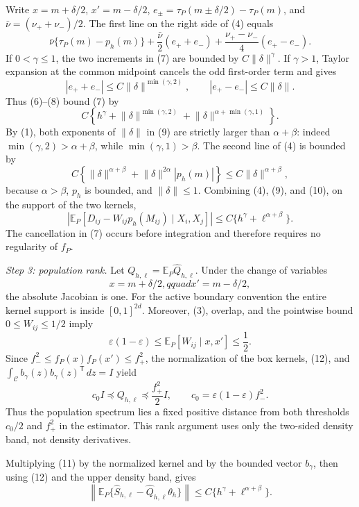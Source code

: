 Write \(x=m+\delta/2\), \(x'=m-\delta/2\),
\(e_\pm=\tau_P(m\pm\delta/2)-\tau_P(m)\), and
\(\bar\nu=(\nu_++\nu_-)/2\).  The first line on the right side of (4)
equals
\[
\bar\nu\{\tau_P(m)-p_h(m)\}
+\frac{\bar\nu}{2}(e_++e_-)
+\frac{\nu_+-\nu_-}{4}(e_+-e_-).
\tag{7}
\]
If \(0<\gamma\leq1\), the two increments in (7) are bounded by
\(C\lVert\delta\rVert^\gamma\).  If \(\gamma>1\), Taylor expansion at
the common midpoint cancels the odd first-order term and gives
\[
|e_++e_-|\leq C\lVert\delta\rVert^{\min(\gamma,2)},
\qquad
|e_+-e_-|\leq C\lVert\delta\rVert.
\tag{8}
\]
Thus (6)--(8) bound (7) by
\[
C\left\{h^\gamma
+\lVert\delta\rVert^{\min(\gamma,2)}
+\lVert\delta\rVert^{\alpha+\min(\gamma,1)}\right\}.
\tag{9}
\]
By (1), both exponents of \(\lVert\delta\rVert\) in (9) are strictly
larger than \(\alpha+\beta\): indeed
\(\min(\gamma,2)>\alpha+\beta\), while
\(\min(\gamma,1)>\beta\).  The second line of (4) is bounded by
\[
C\left\{
\lVert\delta\rVert^{\alpha+\beta}
+\lVert\delta\rVert^{2\alpha}|p_h(m)|
\right\}
\leq C\lVert\delta\rVert^{\alpha+\beta},
\tag{10}
\]
because \(\alpha>\beta\), \(p_h\) is bounded, and
\(\lVert\delta\rVert\leq1\).  Combining (4), (9), and (10), on the
support of the two kernels,
\[
\left|\mathbb E_P[D_{ij}-W_{ij}p_h(M_{ij})\mid X_i,X_j]\right|
\leq C\{h^\gamma+\ell^{\alpha+\beta}\}.
\tag{11}
\]
The cancellation in (7) occurs before integration and therefore requires no
regularity of \(f_P\).

\emph{Step 3: population rank.}
Let \(Q_{h,\ell}=\mathbb E_P\widehat Q_{h,\ell}\).  Under the change of
variables
\[
x=m+\delta/2,qquad x'=m-\delta/2,
\tag{12}
\]
the absolute Jacobian is one.  For the active boundary convention the entire
kernel support is inside \([0,1]^{2d}\).  Moreover, (3), overlap, and the
pointwise bound \(0\leq W_{ij}\leq1/2\) imply
\[
\varepsilon(1-\varepsilon)
\leq\mathbb E_P[W_{ij}\mid x,x']\leq\frac12.
\tag{13}
\]
Since \(f_-^2\leq f_P(x)f_P(x')\leq f_+^2\), the normalization of the
box kernels, (12), and
\(\int_{\mathcal C}b_\gamma(z)b_\gamma(z)^{\mathsf T}\,dz=I\) yield
\[
c_0 I\preceq Q_{h,\ell}\preceq\frac{f_+^2}{2}I,
\qquad c_0=\varepsilon(1-\varepsilon)f_-^2.
\tag{14}
\]
Thus the population spectrum lies a fixed positive distance from both
thresholds \(c_0/2\) and \(f_+^2\) in the estimator.  This rank argument uses
only the two-sided density band, not density derivatives.

Multiplying (11) by the normalized kernel and by the bounded vector
\(b_\gamma\), then using (12) and the upper density band, gives
\[
\left\|
\mathbb E_P\{\widehat S_{h,\ell}
-\widehat Q_{h,\ell}\theta_h\}
\right\|
\leq C\{h^\gamma+\ell^{\alpha+\beta}\}.
\tag{15}
\]

